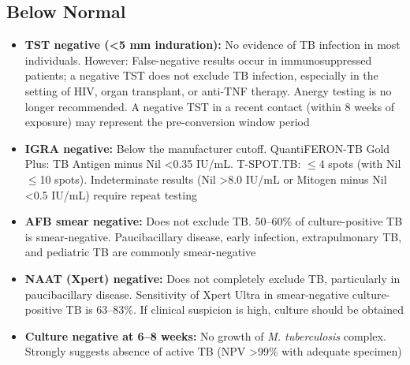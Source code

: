 \subsection*{Below Normal}
\begin{itemize}
  \item \textbf{TST negative (<5 mm induration):} No evidence of TB infection in most individuals. However: False-negative results occur in immunosuppressed patients; a negative TST does not exclude TB infection, especially in the setting of HIV, organ transplant, or anti-TNF therapy. Anergy testing is no longer recommended. A negative TST in a recent contact (within 8 weeks of exposure) may represent the pre-conversion window period
  \item \textbf{IGRA negative:} Below the manufacturer cutoff. QuantiFERON-TB Gold Plus: TB Antigen minus Nil <0.35 IU/mL. T-SPOT.TB: $\leq$4 spots (with Nil $\leq$10 spots). Indeterminate results (Nil >8.0 IU/mL or Mitogen minus Nil <0.5 IU/mL) require repeat testing
  \item \textbf{AFB smear negative:} Does not exclude TB. 50--60\% of culture-positive TB is smear-negative. Paucibacillary disease, early infection, extrapulmonary TB, and pediatric TB are commonly smear-negative
  \item \textbf{NAAT (Xpert) negative:} Does not completely exclude TB, particularly in paucibacillary disease. Sensitivity of Xpert Ultra in smear-negative culture-positive TB is 63--83\%. If clinical suspicion is high, culture should be obtained
  \item \textbf{Culture negative at 6--8 weeks:} No growth of \textit{M. tuberculosis} complex. Strongly suggests absence of active TB (NPV >99\% with adequate specimen)
\end{itemize}

